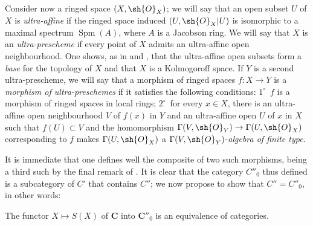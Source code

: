 
\begin{env}[10.9.5]
\label{IV.10.9.5}
Consider now a ringed space $(X,\sh{O}_X)$; we will say that an open subset $U$ of $X$ is \emph{ultra-affine} if the ringed space induced $(U,\sh{O}_X|U)$ is isomorphic to a maximal spectrum $\operatorname{Spm}(A)$, where $A$ is a Jacobson ring.
We will say that $X$ is an \emph{ultra-prescheme} if every point of $X$ admits an ultra-affine open neighbourhood.
One shows, as in  and , that the ultra-affine open subsets form a \emph{base} for the topology of $X$ and that $X$ is a Kolmogoroff space.
If $Y$ is a second ultra-prescheme, we will say that a morphism of ringed spaces $f:X\to Y$ is a \emph{morphism of ultra-preschemes} if it satisfies the following conditions: $1^\circ$~$f$ is a morphism of ringed spaces in local rings; $2^\circ$~for every $x\in X$, there is an ultra-affine open neighbourhood $V$ of $f(x)$ in $Y$ and an ultra-affine open $U$ of $x$ in $X$ such that $f(U)\subset V$ and the homomorphism $\Gamma(V,\sh{O}_Y)\to\Gamma(U,\sh{O}_X)$ corresponding to $f$ makes $\Gamma(U,\sh{O}_X)$ a $\Gamma(V,\sh{O}_Y)$-\emph{algebra of finite type}.

It is immediate that one defines well the composite of two such morphisms, being a third such by the final remark of .
It is clear that the category $C''_0$ thus defined is a subcategory of $C'$ that contains $C''$; we now propose to show that $C''=C''_0$, in other words:
\end{env}

\begin{proposition}[10.9.6]
\label{IV.10.9.6}
The functor $X\mapsto S(X)$ of $\mathbf{C}$ into $\mathbf{C}''_0$ is an equivalence of categories.
\end{proposition}

